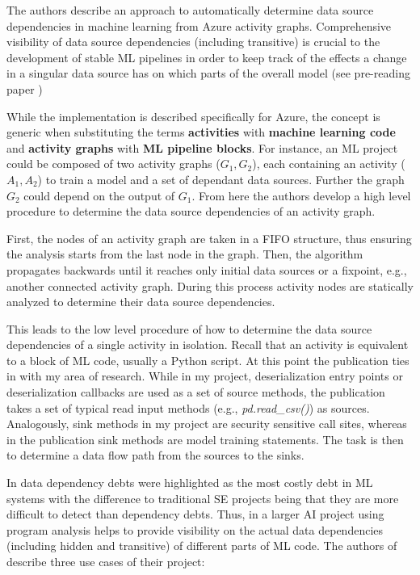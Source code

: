 \documentclass[11pt]{article}
\begin{document}
The authors describe an approach to automatically determine data source dependencies in machine learning from Azure activity graphs. Comprehensive visibility of data source dependencies (including transitive) is crucial to the development of stable ML pipelines in order to keep track of the effects a change in a singular data source has on which parts of the overall model (see pre-reading paper \cite{hidden_debt})

While the implementation is described specifically for Azure, the concept is generic when substituting the terms \textbf{activities} with \textbf{machine learning code} and \textbf{activity graphs} with \textbf{ML pipeline blocks}. For instance, an ML project could be composed of two activity graphs ($G_1, G_2$), each containing an activity ($A_1, A_2$) to train a model and a set of dependant data sources. Further the graph $G_2$ could depend on the output of $G_1$. From here the authors develop a high level procedure to determine the data source dependencies of an activity graph.

First, the nodes of an activity graph are taken in a FIFO structure, thus ensuring the analysis starts from the last node in the graph. Then, the algorithm propagates backwards until it reaches only initial data sources or a fixpoint, e.g., another connected activity graph. During this process activity nodes are statically analyzed to determine their data source dependencies. 

This leads to the low level procedure of how to determine the data source dependencies of a single activity in isolation. Recall that an activity is equivalent to a block of ML code, usually a Python script. At this point the publication ties in with my area of research. While in my project, deserialization entry points or deserialization callbacks are used as a set of source methods, the publication takes a set of typical read input methods (e.g., \textit{pd.read\_csv()}) as sources. Analogously, sink methods in my project are security sensitive call sites, whereas in the publication sink methods are model training statements. The task is then to determine a data flow path from the sources to the sinks. 

In \cite{hidden_debt} data dependency debts were highlighted as the most costly debt in ML systems with the difference to traditional SE projects being that they are more difficult to detect than dependency debts. Thus, in a larger AI project using program analysis helps to provide visibility on the actual data dependencies (including hidden and transitive) of different parts of ML code. The authors of \cite{datahell} describe three use cases of their project:
\end{document}
